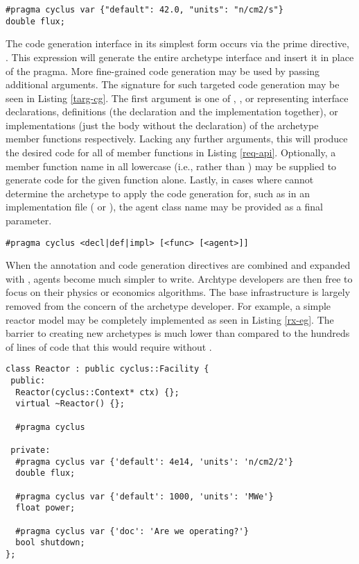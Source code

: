 \begin{lstlisting}[caption={Flux State Variable Annotation}, label=flux-pragma]
#pragma cyclus var {"default": 42.0, "units": "n/cm2/s"}
double flux;
\end{lstlisting}

The code generation interface in its simplest form occurs via the \cyclus
prime directive, .  This expression will
generate the entire archetype interface and insert it in place of the pragma.
More fine-grained code generation may be used by passing additional arguments.
The signature for such targeted code generation may be seen in Listing \ref{targ-cg}.
The first argument is one of , , or  representing
interface declarations, definitions (the declaration and the implementation together),
or implementations (just the body without the declaration) of the archetype member
functions respectively. Lacking any further arguments, this will produce the desired code for
all of member functions in Listing \ref{req-api}.  Optionally, a member function
name in all lowercase (i.e.,  rather than ) may
be supplied to generate code for the given function alone.  Lastly, in
cases where \cycpp cannot determine the archetype to apply the code generation for,
such as in an implementation file ( or ), the agent
class name may be provided as a final parameter.

\begin{lstlisting}[caption={Targeted Code Generation Directive Signatures},
                   label=targ-cg]
#pragma cyclus <decl|def|impl> [<func> [<agent>]]
\end{lstlisting}

When the annotation and code generation directives are combined and expanded with
\cycpp, agents become much simpler to write.
Archtype developers are then free to focus on their physics
or economics algorithms. The base \cyclus
infrastructure is largely removed from the concern of the archetype developer.
For example, a simple reactor model may be completely implemented as seen in
Listing \ref{rx-eg}. The barrier to creating new archetypes is much lower than
compared to the hundreds of lines of code that this would require without \cycpp.

\begin{lstlisting}[caption={Simple Reactor Archetype}, label=rx-eg]
class Reactor : public cyclus::Facility {
 public:
  Reactor(cyclus::Context* ctx) {};
  virtual ~Reactor() {};

  #pragma cyclus

 private:
  #pragma cyclus var {'default': 4e14, 'units': 'n/cm2/2'}
  double flux;

  #pragma cyclus var {'default': 1000, 'units': 'MWe'}
  float power;

  #pragma cyclus var {'doc': 'Are we operating?'}
  bool shutdown;
};
\end{lstlisting}

